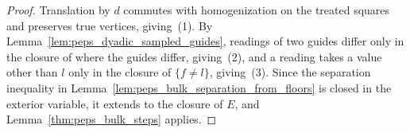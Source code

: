 \begin{proof}\leanok
    Translation by $d$ commutes with homogenization on the treated squares and preserves true vertices, giving~(1). By Lemma~\ref{lem:peps_dyadic_sampled_guides}, readings of two guides differ only in the closure of where the guides differ, giving~(2), and a reading takes a value other than $l$ only in the closure of $\{f\ne l\}$, giving~(3). Since the separation inequality in Lemma~\ref{lem:peps_bulk_separation_from_floors} is closed in the exterior variable, it extends to the closure of $E$, and Lemma~\ref{thm:peps_bulk_steps} applies.
\end{proof}
